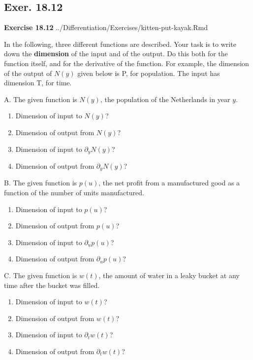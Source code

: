 \documentclass[
  letterpaper,
  DIV=11,
  numbers=noendperiod,
  oneside]{article}
\providecommand{\tightlist}{%
  \setlength{\itemsep}{0pt}\setlength{\parskip}{0pt}}\usepackage{longtable,booktabs,array}
\begin{document}
\begin{multicols}{2}
\hypertarget{exer.-18.12}{%
\section*{Exer. 18.12}\label{exer.-18.12}}

\textbf{Exercise 18.12}
../Differentiation/Exercises/kitten-put-kayak.Rmd

In the following, three different functions are described. Your task is
to write down the \textbf{dimension} of the input and of the output. Do
this both for the function itself, and for the derivative of the
function. For example, the dimension of the output of \(N(y)\) given
below is P, for population. The input has dimension T, for time.

A. The given function is \(N(y)\), the population of the Netherlands in
year \(y\).

\begin{enumerate}
\def\labelenumi{\roman{enumi}.}
\tightlist
\item
  Dimension of input to \(N(y)\)?
\item
  Dimension of output from \(N(y)\)?
\item
  Dimension of input to \(\partial_y N(y)\)?
\item
  Dimension of output from \(\partial_y N(y)\)?
\end{enumerate}

B. The given function is \(p(u)\), the net profit from a manufactured
good as a function of the number of units manufactured.

\begin{enumerate}
\def\labelenumi{\roman{enumi}.}
\tightlist
\item
  Dimension of input to \(p(u)\)?
\item
  Dimension of output from \(p(u)\)?
\item
  Dimension of input to \(\partial_u p(u)\)?
\item
  Dimension of output from \(\partial_u p(u)\)?
\end{enumerate}

C. The given function is \(w(t)\), the amount of water in a leaky bucket
at any time after the bucket was filled.

\begin{enumerate}
\def\labelenumi{\roman{enumi}.}
\tightlist
\item
  Dimension of input to \(w(t)\)?
\item
  Dimension of output from \(w(t)\)?
\item
  Dimension of input to \(\partial_t w(t)\)?
\item
  Dimension of output from \(\partial_t w(t)\)?
\end{enumerate}


\end{multicols}
\end{document}
